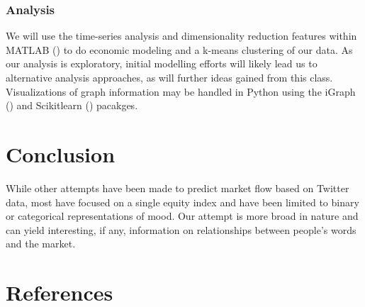 \documentclass[titlepage]{article}\usepackage[]{graphicx}\usepackage[]{color}
\begin{document}
\subsubsection{Analysis}
We will use the time-series analysis and dimensionality reduction features
within MATLAB (\cite{MATLAB:2014}) to do economic modeling and a k-means clustering of our data. As
our analysis is exploratory, initial modelling efforts will likely lead us to
alternative analysis approaches, as will further ideas gained from this class.
Visualizations of graph information may be handled in Python using the
iGraph (\cite{Csardi2006}) and Scikitlearn (\cite{scikit-learn}) pacakges.


\section{Conclusion}
While other attempts have been made to predict market flow based on Twitter
data, most have focused on a single equity index and have been limited to
binary or categorical representations of mood. Our attempt is more broad in
nature and can yield interesting, if any, information on relationships between
people’s words and the market. 


\section{References}
\printbibliography
\end{document}
